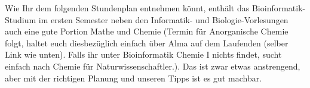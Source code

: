 Wie Ihr dem folgenden Stundenplan entnehmen könnt, enthält das Bioinformatik-Studium im ersten
Semester neben den Informatik- und Biologie-Vorlesungen auch eine gute Portion Mathe und Chemie (Termin für Anorganische Chemie folgt, haltet euch diesbezüglich einfach über Alma auf dem Laufenden (selber Link wie unten). Falls ihr unter Bioinformatik Chemie I nichts findet, sucht einfach nach Chemie für Naturwissenschaftler.).
Das ist zwar etwas anstrengend, aber mit der richtigen Planung und unseren Tipps ist es gut machbar.\\

